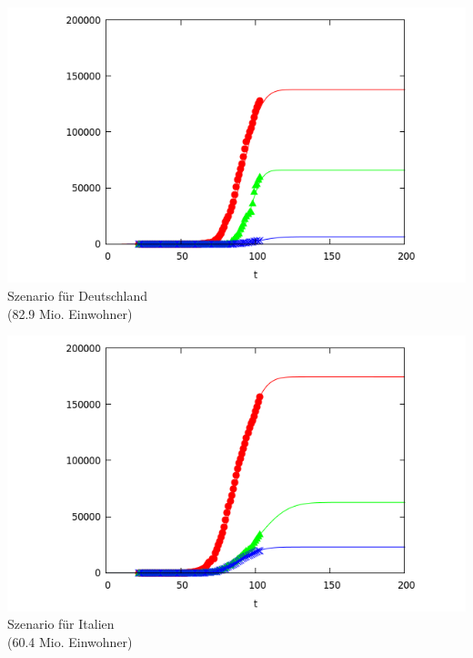 \documentclass[a4paper,11pt]{article}
\begin{document}
\begin{center}
  \begin{minipage}{.48\textwidth}\centering
  \includegraphics[width=\textwidth]{Germany.png}\\[1em]
  {Szenario für Deutschland\\ (82.9 Mio. Einwohner)}
  \end{minipage}\hfill
  \begin{minipage}{.48\textwidth}\centering
  \includegraphics[width=\textwidth]{Italy.png}\\[1em]
  {Szenario für Italien\\ (60.4 Mio. Einwohner)}
  \end{minipage}
  

\end{center}
\end{document}
